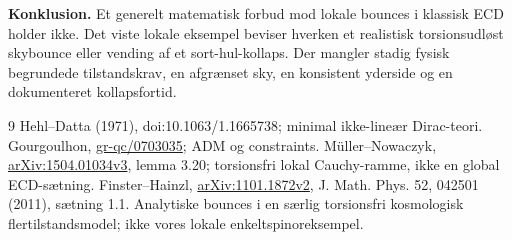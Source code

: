 \documentclass[11pt,a4paper]{article}
\begin{document}
\textbf{Konklusion.} Et generelt matematisk forbud mod lokale bounces i klassisk ECD holder ikke. Det viste lokale eksempel beviser hverken et realistisk torsionsudløst skybounce eller vending af et sort-hul-kollaps. Der mangler stadig fysisk begrundede tilstandskrav, en afgrænset sky, en konsistent yderside og en dokumenteret kollapsfortid.

\begin{thebibliography}{9}
 Hehl--Datta (1971), doi:10.1063/1.1665738; minimal ikke-lineær Dirac-teori.
 Gourgoulhon, \href{https://arxiv.org/abs/gr-qc/0703035}{gr-qc/0703035}; ADM og constraints.
 M\"uller--Nowaczyk, \href{https://arxiv.org/abs/1504.01034}{arXiv:1504.01034v3}, lemma 3.20; torsionsfri lokal Cauchy-ramme, ikke en global ECD-sætning.
 Finster--Hainzl, \href{https://arxiv.org/abs/1101.1872}{arXiv:1101.1872v2}, J. Math. Phys. 52, 042501 (2011), sætning 1.1. Analytiske bounces i en særlig torsionsfri kosmologisk flertilstandsmodel; ikke vores lokale enkeltspinoreksempel.
\end{thebibliography}
\end{document}
